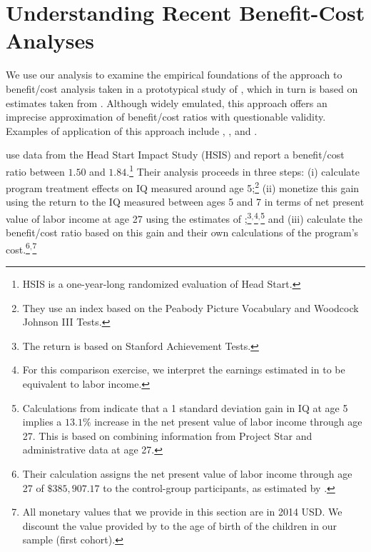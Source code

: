 \section{Understanding Recent Benefit-Cost Analyses} \label{section:bcaestimates}

We use our analysis to examine the empirical foundations of the approach to benefit/cost analysis taken in a prototypical study of \citet{Kline_Walters_2016_QJE}, which in turn is based on estimates taken from \citet{Chetty_Friedman_etal_2011_QJoE}. Although widely emulated, this approach offers an imprecise approximation of benefit/cost ratios with questionable validity. Examples of application of this approach include \citet{Attanasio_Kugler_Meghir_2011_AEJAE}, \cite{Behrman-et-al_2011_JHR-Progresa}, and \cite{Lafortune_etal_2018_Reform_AEJAE}.

\citet{Kline_Walters_2016_QJE} use data from the Head Start Impact Study (HSIS) and report a benefit/cost ratio between $1.50$ and $1.84$.\footnote{HSIS is a one-year-long randomized evaluation of Head Start.} Their analysis proceeds in three steps: (i) calculate program treatment effects on IQ measured around age 5;\footnote{They use an index based on the Peabody Picture Vocabulary and Woodcock Johnson III Tests.} (ii) monetize this gain using the return to the IQ measured between ages 5 and 7 in terms of net present value of labor income at age 27 using the estimates of \citet{Chetty_Friedman_etal_2011_QJoE};\footnote{The \citet{Chetty_Friedman_etal_2011_QJoE} return is based on Stanford Achievement Tests.}$^,$\footnote{For this comparison exercise, we interpret the earnings estimated in \citet{Chetty_Friedman_etal_2011_QJoE} to be equivalent to labor income.}$^,$\footnote{Calculations from \citet{Chetty_Friedman_etal_2011_QJoE} indicate that a 1 standard deviation gain in IQ at age 5 implies a $13.1\%$ increase in the net present value of labor income through age 27. This is based on combining information from Project Star and administrative data at age 27.} and (iii) calculate the benefit/cost ratio based on this gain and their own calculations of the program's cost.\footnote{Their calculation assigns the net present value of labor income through age 27 of $\$385,907.17$ to the control-group participants, as estimated by  \citet{Chetty_Friedman_etal_2011_QJoE}.}$^,$\footnote{All monetary values that we provide in this section are in 2014 USD. We discount the value provided by \citet{Chetty_Friedman_etal_2011_QJoE} to the age of birth of the children in our sample (first cohort).}





